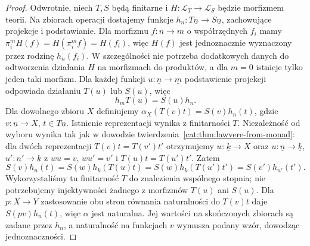 \begin{proof}
Odwrotnie, niech $T,S$ będą finitarne i $H:\mathcal L_T\to\mathcal L_S$ będzie morfizmem teorii. Na zbiorach operacji dostajemy funkcje $h_n:T\underline n\to S\underline n$, zachowujące projekcje i podstawianie. Dla morfizmu $f:n\to m$ o współrzędnych $f_i$ mamy $\pi_i^m H(f)=H(\pi_i^m f)=H(f_i)$, więc $H(f)$ jest jednoznacznie wyznaczony przez rodzinę $h_n(f_i)$. W szczególności nie potrzeba dodatkowych danych do odtworzenia działania $H$ na morfizmach do produktów, a dla $m=0$ istnieje tylko jeden taki morfizm. Dla każdej funkcji $u:\underline n\to\underline m$ podstawienie projekcji odpowiada działaniu $T(u)$ lub $S(u)$, więc
\[
 h_m T(u)=S(u)h_n.
\]
Dla dowolnego zbioru $X$ definiujemy $\alpha_X(T(v)t)=S(v)h_n(t)$, gdzie $v:\underline n\to X$, $t\in T\underline n$. Istnienie reprezentacji wynika z finitarności $T$. Niezależność od wyboru wynika tak jak w dowodzie twierdzenia~\ref{cat:thm:lawvere-from-monad}: dla dwóch reprezentacji $T(v)t=T(v')t'$ otrzymujemy $w:\underline k\to X$ oraz $u:\underline n\to\underline k$, $u':\underline{n'}\to\underline k$ z $wu=v$, $wu'=v'$ i $T(u)t=T(u')t'$. Zatem
\[
 S(v)h_n(t)=S(w)h_k(T(u)t)
 =S(w)h_k(T(u')t')=S(v')h_{n'}(t').
\]
Wykorzystaliśmy tu finitarność $T$ do znalezienia wspólnego stopnia; nie potrzebujemy injektywności żadnego z morfizmów $T(u)$ ani $S(u)$. Dla $p:X\to Y$ zastosowanie obu stron równania naturalności do $T(v)t$ daje $S(pv)h_n(t)$, więc $\alpha$ jest naturalna. Jej wartości na skończonych zbiorach są zadane przez $h_n$, a naturalność na funkcjach $v$ wymusza podany wzór, dowodząc jednoznaczności.


\end{proof}
